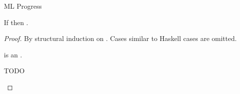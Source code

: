 \begin{theorem}{ML Progress}

\label{thmpsm}

If \judem{}{\first{\varexpm}}{\vartym} then \pshyp{\first{\varexpm}}{\second{\varexpm}}.

\begin{proof}

By structural induction on \first{\varexpm}.  Cases similar to Haskell cases are omitted.


\newcommand{\psconswm}{\expcons{\first{\varvalum}}{\second{\varvalum}}\xspace}

\begin{case}{\psconswm}

\psconswm is an \prouv.

\end{case}


\newcommand{\psmh}{\expmh{\first{\vartym}}{\first{\vartyh}}{\first{\varexph}}\xspace}

\begin{case}{\psmh}

\pshypby
{\first{\varexph}}
{\second{\varexph}}
\pscasestwo
{\first{\varexph}}
{\first{\vartym}}
{\first{\vartyh}}
{\psmh}


TODO

\begin{subcase}{}

\end{subcase}

\pssub
{\first{\varexph}}
{\second{\varexph}}
{\psmh}
{\expmh{\first{\vartym}}{\first{\vartyh}}{\second{\varexph}}}
\pserr
{\first{\varexph}}
{\psmh}

\end{case}


\newcommand{\psfappm}{\expfapp{\first{\varexpm}}{\second{\varexpm}}}
\renewcommand{\x}{\expfabss{\varvarm}{\first{\vartym}}{\third{\varexpm}}}

\begin{case}{\psfappm}

\pshypby
{\first{\varexpm}}
{\third{\varexpm}}
\psvalifeqm
{\first{\varexpm}}
{\tyfun{\first{\vartym}}{\second{\vartym}}}
{\x}
\pssub
{\first{\varexpm}}
{\third{\varexpm}}
{\psfappm}
{\expfapp{\third{\varexpm}}{\second{\varexpm}}}
\pserr
{\first{\varexpm}}
{\psfappm}
\pshypby
{\second{\varexpm}}
{\third{\varexpm}}
\pssuband
{\second{\varexpm}}
{\third{\varexpm}}
{\first{\varexpm}}
{\psfappm}
{\expfapp{\first{\varexpm}}{\third{\varexpm}}}
\pserrand
{\second{\varexpm}}
{\first{\varexpm}}
{\psfappm}
\psred
{\expfapp{(\x)}{\second{\varexpm}}}
{\expsubst{\third{\varexpm}}{\second{\varexpm}}{\varvarm}}


\end{case}
\end{proof}
\end{theorem}
